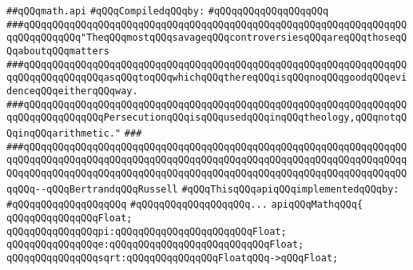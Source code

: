 \label{src/lib/std/src/math.api}
\verb|##qQQqmath.api|\newline
\newline
\verb|#qQQqCompiledqQQqby:|\newline
\verb|#qQQqqQQqqQQqqQQqqQQq|\newline
\newline
\newline
\newline
\verb|###qQQqqQQqqQQqqQQqqQQqqQQqqQQqqQQqqQQqqQQqqQQqqQQqqQQqqQQqqQQqqQQqqQQqqQQqqQQqqQQq"TheqQQqmostqQQqsavageqQQqcontroversiesqQQqareqQQqthoseqQQqaboutqQQqmatters|\newline
\verb|###qQQqqQQqqQQqqQQqqQQqqQQqqQQqqQQqqQQqqQQqqQQqqQQqqQQqqQQqqQQqqQQqqQQqqQQqqQQqqQQqqQQqasqQQqtoqQQqwhichqQQqthereqQQqisqQQqnoqQQqgoodqQQqevidenceqQQqeitherqQQqway.|\newline
\verb|###qQQqqQQqqQQqqQQqqQQqqQQqqQQqqQQqqQQqqQQqqQQqqQQqqQQqqQQqqQQqqQQqqQQqqQQqqQQqqQQqqQQqPersecutionqQQqisqQQqusedqQQqinqQQqtheology,qQQqnotqQQqinqQQqarithmetic."|\newline
\verb|###|\newline
\verb|###qQQqqQQqqQQqqQQqqQQqqQQqqQQqqQQqqQQqqQQqqQQqqQQqqQQqqQQqqQQqqQQqqQQqqQQqqQQqqQQqqQQqqQQqqQQqqQQqqQQqqQQqqQQqqQQqqQQqqQQqqQQqqQQqqQQqqQQqqQQqqQQqqQQqqQQqqQQqqQQqqQQqqQQqqQQqqQQqqQQqqQQqqQQqqQQqqQQqqQQqqQQqqQQqqQQq--qQQqBertrandqQQqRussell|\newline
\newline
\verb|#qQQqThisqQQqapiqQQqimplementedqQQqby:|\newline
\verb|#qQQqqQQqqQQqqQQqqQQq|\newline
\verb|#qQQqqQQqqQQqqQQqqQQq...|\newline
\newline
\verb|apiqQQqMathqQQq{|\newline
\newline
\verb|qQQqqQQqqQQqqQQqFloat;|\newline
\newline
\verb|qQQqqQQqqQQqqQQqpi:qQQqqQQqqQQqqQQqqQQqqQQqFloat;|\newline
\verb|qQQqqQQqqQQqqQQqe:qQQqqQQqqQQqqQQqqQQqqQQqqQQqFloat;|\newline
\newline
\verb|qQQqqQQqqQQqqQQqsqrt:qQQqqQQqqQQqqQQqFloatqQQq->qQQqFloat;|\newline
